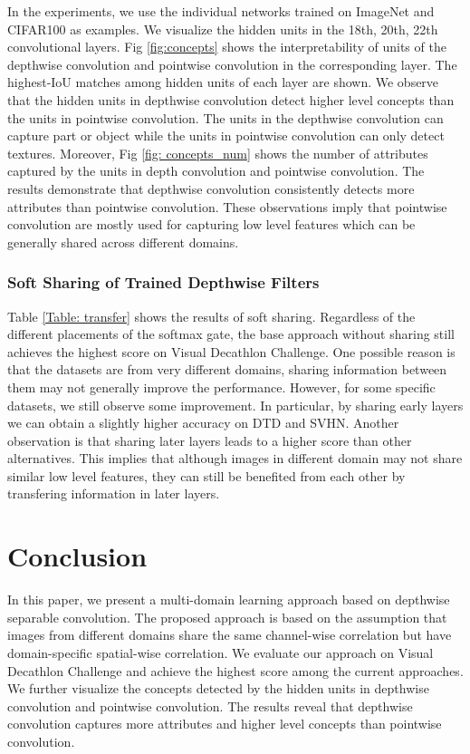 \documentclass[letterpaper]{article} \usepackage{aaai19}  \usepackage{times}  \usepackage{helvet}  \usepackage{courier}  \usepackage{url}  \usepackage{graphicx}  \usepackage{amssymb}
\begin{document}
In the experiments, we use the individual networks trained on ImageNet and CIFAR100 as examples. We visualize the hidden units in the 18th, 20th, 22th convolutional layers. Fig \ref{fig:concepts} shows the interpretability of units of the depthwise convolution and pointwise convolution in the corresponding layer. The highest-IoU matches among hidden units of each layer are shown. We observe that the hidden units in depthwise convolution detect higher level concepts than the units in pointwise convolution. The units in the depthwise convolution can capture part or object while the units in pointwise convolution can only detect textures. Moreover, Fig \ref{fig: concepts_num} shows the number of attributes captured by the units in depth convolution and pointwise convolution. The results demonstrate that depthwise convolution consistently detects more attributes than pointwise convolution. These observations imply that pointwise convolution are mostly used for capturing low level features which can be generally shared across different domains.

\subsubsection{Soft Sharing of Trained Depthwise Filters}
Table \ref{Table: transfer} shows the results of soft sharing. Regardless of the different placements of the softmax gate, the base approach without sharing still achieves the highest score on Visual Decathlon Challenge. One possible reason is that the datasets are from very different domains, sharing information between them may not generally improve the performance. However, for some specific datasets, we still observe some improvement. In particular, by sharing early layers we can obtain a slightly higher accuracy on DTD and SVHN. Another observation is that sharing later layers leads to a higher score than other alternatives. This implies that although images in different domain may not share similar low level features, they can still be benefited from each other by transfering information in later layers. 


\section{Conclusion}
In this paper, we present a multi-domain learning approach based on depthwise separable convolution. The proposed approach is based on the assumption that images from different domains share the same channel-wise correlation but have domain-specific spatial-wise correlation. We evaluate our approach on Visual Decathlon Challenge and achieve the highest score among the current approaches. We further visualize the concepts detected by the hidden units in depthwise convolution and pointwise convolution. The results reveal that depthwise convolution captures more attributes and higher level concepts than pointwise convolution.
\end{document}
